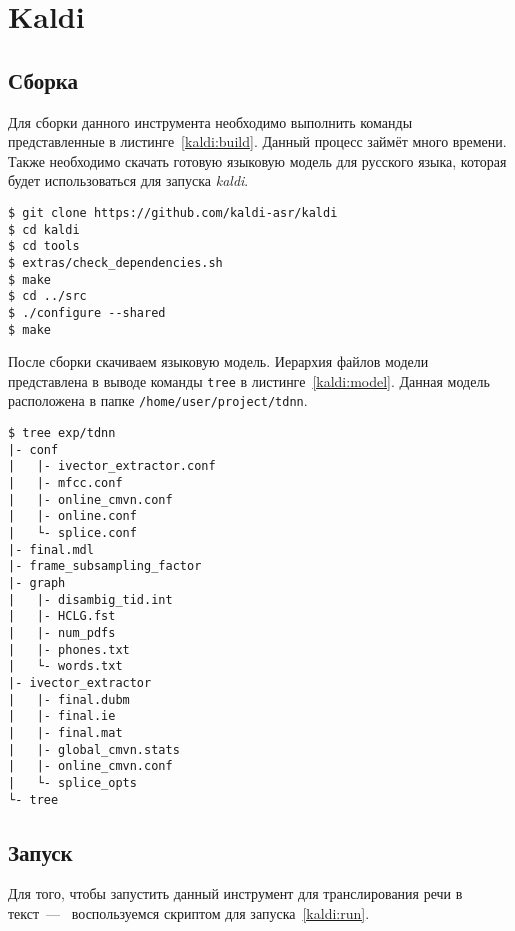 \section{Kaldi}
\subsection{Сборка}
Для сборки данного инструмента необходимо выполнить команды
представленные в листинге~\ref{kaldi:build}. Данный процесс займёт много времени.
Также необходимо скачать готовую языковую модель для русского языка, которая
будет использоваться для запуска \textit{kaldi}.

\begin{lstlisting}[caption={Сборка Kaldi}, label=kaldi:build]
$ git clone https://github.com/kaldi-asr/kaldi
$ cd kaldi
$ cd tools
$ extras/check_dependencies.sh
$ make
$ cd ../src
$ ./configure --shared
$ make
\end{lstlisting}

После сборки скачиваем языковую модель. Иерархия файлов модели представлена
в выводе команды \texttt{tree} в листинге~\ref{kaldi:model}. Данная модель
расположена в папке \texttt{/home/user/project/tdnn}.

\begin{lstlisting}[caption={Структура языковой модели}, label={kaldi:model}]
$ tree exp/tdnn
|- conf
|   |- ivector_extractor.conf
|   |- mfcc.conf
|   |- online_cmvn.conf
|   |- online.conf
|   └- splice.conf
|- final.mdl
|- frame_subsampling_factor
|- graph
|   |- disambig_tid.int
|   |- HCLG.fst
|   |- num_pdfs
|   |- phones.txt
|   └- words.txt
|- ivector_extractor
|   |- final.dubm
|   |- final.ie
|   |- final.mat
|   |- global_cmvn.stats
|   |- online_cmvn.conf
|   └- splice_opts
└- tree
\end{lstlisting}

\subsection{Запуск}
Для того, чтобы запустить данный инструмент для транслирования речи в текст~---~
воспользуемся скриптом для запуска~\ref{kaldi:run}.

